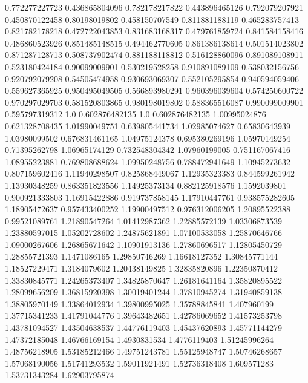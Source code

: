  0.772277227723   0.436865804096
 0.782178217822   0.443896465126
 0.792079207921   0.450870122458
  0.80198019802   0.458150707549
 0.811881188119   0.465283757413
 0.821782178218   0.472722043853
 0.831683168317   0.479761859724
 0.841584158416   0.486860523926
 0.851485148515   0.494462770605
 0.861386138614   0.501514023802
 0.871287128713   0.508737902474
 0.881188118812   0.516128860096
 0.891089108911   0.523180424184
  0.90099009901   0.530219528258
 0.910891089109   0.538032156756
 0.920792079208    0.54505474958
 0.930693069307   0.552105295854
 0.940594059406   0.559627365925
 0.950495049505   0.566893980291
 0.960396039604   0.574250600722
 0.970297029703   0.581520803865
 0.980198019802   0.588365516087
 0.990099009901   0.595797319312
            1.0   0.602876482135
            1.0   0.602876482135
  1.00995024876   0.621328708435
  1.01990049751   0.639805441734
  1.02985074627    0.65830643939
  1.03980099502   0.676831461165
  1.04975124378   0.695380269196
  1.05970149254    0.71395262798
  1.06965174129   0.732548304342
  1.07960199005   0.751167067416
  1.08955223881   0.769808688624
  1.09950248756   0.788472941649
  1.10945273632   0.807159602416
  1.11940298507   0.825868449067
  1.12935323383   0.844599261942
  1.13930348259   0.863351823556
  1.14925373134   0.882125918576
   1.1592039801   0.900921333803
  1.16915422886   0.919737858145
  1.17910447761   0.938575282605
  1.18905472637   0.957433400252
  1.19900497512   0.976312006205
  1.20895522388    0.99521089761
  1.21890547264    1.01412987362
  1.22885572139    1.03306873539
  1.23880597015    1.05202728602
  1.24875621891    1.07100533058
  1.25870646766    1.09000267606
  1.26865671642    1.10901913136
  1.27860696517    1.12805450729
  1.28855721393     1.1471086165
  1.29850746269    1.16618127352
  1.30845771144    1.18527229471
   1.3184079602    1.20438149825
  1.32835820896    1.22350870412
  1.33830845771    1.24265373407
  1.34825870647    1.26181641164
  1.35820895522    1.28099656209
  1.36815920398    1.30019401244
  1.37810945274    1.31940859138
  1.38805970149    1.33864012934
  1.39800995025    1.35788845841
    1.407960199    1.37715341233
  1.41791044776    1.39643482651
  1.42786069652    1.41573253798
  1.43781094527    1.43504638537
  1.44776119403    1.45437620893
  1.45771144279    1.47372185048
  1.46766169154     1.4930831534
   1.4776119403    1.51245996264
  1.48756218905    1.53185212466
  1.49751243781    1.55125948747
  1.50746268657    1.57068190056
  1.51741293532    1.59011921491
  1.52736318408      1.609571283
  1.53731343284    1.62903795874
